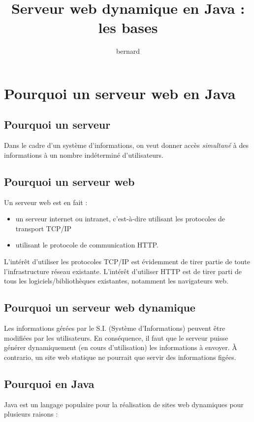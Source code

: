 \documentclass[11pt]{article}
\author{bernard}
\date{}
\title{Serveur web dynamique en Java : les bases}
\begin{document}
\maketitle
\setcounter{tocdepth}{2}
\tableofcontents


\section{Pourquoi un serveur web en Java}
\label{sec:org6fe11ce}
\subsection{Pourquoi un serveur}
\label{sec:orge77076f}
Dans le cadre d'un système d'informations, on veut donner accès \emph{simultané} à des
informations à un nombre indéterminé d'utilisateurs.



\subsection{Pourquoi un serveur web}
\label{sec:org02b4d38}
Un serveur web est en fait :
\begin{itemize}
\item un serveur internet ou intranet, c'est-à-dire utilisant les protocoles de transport TCP/IP
\item utilisant le protocole de communication HTTP.
\end{itemize}

L'intérêt d'utiliser les protocoles TCP/IP est évidemment de tirer partie de
toute l'infrastructure réseau existante. L'intérêt d'utiliser HTTP est de tirer
parti de tous les logiciels/bibliothèques existantes, notamment les navigateurs web.

\subsection{Pourquoi un serveur web dynamique}
\label{sec:org7d2da29}

Les informations gérées par le S.I. (Système d'Informations) peuvent être
modifiées par les utilisateurs. En conséquence, il faut que le serveur puisse
générer dynamiquement (en cours d'utilisation) les informations à envoyer. À
contrario, un site web statique ne pourrait que servir des informations figées.

\subsection{Pourquoi en Java}
\label{sec:org72c1514}
Java est un langage populaire pour la réalisation de sites web dynamiques pour
plusieurs raisons :
\end{document}

